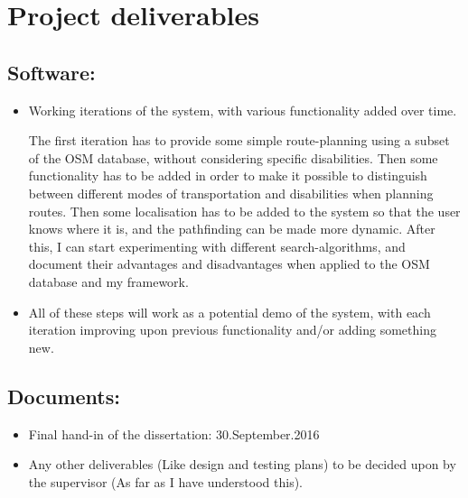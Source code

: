 \documentclass[11pt,fleqn,twoside]{article}
\begin{document}
\section{Project deliverables}

\subsection{Software:}
\begin{itemize}
	\item Working iterations of the system, with various functionality added over time.
	
	\subitem The first iteration has to provide some simple route-planning using a subset of the OSM database, without considering specific disabilities.
	\subitem Then some functionality has to be added in order to make it possible to distinguish between different modes of transportation and disabilities when planning routes.
	\subitem Then some localisation has to be added to the system so that the user knows where it is, and the pathfinding can be made more dynamic.
	\subitem After this, I can start experimenting with different search-algorithms, and document their advantages and disadvantages when applied to the OSM database and my framework.
	
	\item All of these steps will work as a potential demo of the system, with each iteration improving upon previous functionality and/or adding something new.
\end{itemize}

\subsection{Documents:}
\begin{itemize}
	\item Final hand-in of the dissertation:
	\subitem 30.September.2016
	
	\item Any other deliverables (Like design and testing plans) to be decided upon by the supervisor (As far as I have understood this).
\end{itemize}

\end{document}
